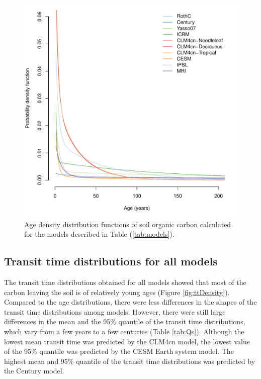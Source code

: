 \documentclass[draft,linenumbers]{agujournal}
\begin{document}


\begin{figure}[t]
   \centering
   \includegraphics[scale=0.75]{Figures/modelsSA} %
   \caption{Age density distribution functions of soil organic carbon calculated for the models described in Table (\ref{tab:models}).}
   \label{fig:ageDensity}
\end{figure}



\subsection{Transit time distributions for all models}
The transit time distributions obtained for all models showed that most of the carbon leaving the soil is of relatively young ages (Figure \ref{fig:ttDensity}). Compared to the age distributions, there were less differences in the shapes of the transit time distributions among models. However, there were still large differences in the mean and the 95\% quantile of the transit time distributions,  which vary from a few years to a few centuries (Table \ref{tab:Qs}). Although the lowest mean transit time was predicted by the CLM4cn model, the lowest value of the 95\% quantile was predicted by the CESM Earth system model. The highest mean and 95\% quantile of the transit time distributions was predicted by the Century model. 
\end{document}
